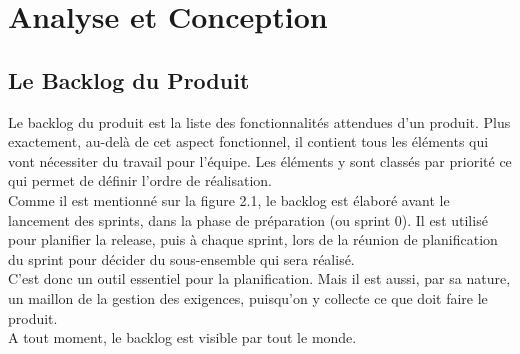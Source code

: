 \chapter{Analyse et Conception} %

\label{Chapitre 2} %



\section{Le Backlog du Produit}
Le backlog du produit est la liste des fonctionnalités attendues d'un produit. Plus exactement, au-delà de cet aspect fonctionnel, il contient tous les éléments qui vont nécessiter du travail pour l'équipe. Les éléments y sont classés par priorité ce qui permet de définir l'ordre de réalisation.\\[0.5cm]
Comme il est mentionné sur la figure 2.1, le backlog est élaboré avant le lancement des sprints, dans la phase de préparation (ou sprint 0). Il est utilisé pour planifier la release, puis à chaque sprint, lors de la réunion de planification du sprint pour décider du sous-ensemble qui sera réalisé.\\[0.2cm]
C'est donc un outil essentiel pour la planification. Mais il est aussi, par sa nature, un maillon de la gestion des exigences, puisqu'on y collecte ce que doit faire le produit.\\[0.2cm]
A tout moment, le backlog est visible par tout le monde.
